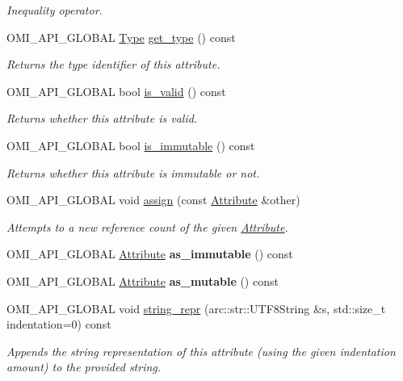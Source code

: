 \begin{DoxyCompactItemize}
\begin{DoxyCompactList}\small\item\em Inequality operator. \end{DoxyCompactList}\item 
O\+M\+I\+\_\+\+A\+P\+I\+\_\+\+G\+L\+O\+B\+AL \hyperlink{classomi_1_1_attribute_aae4992bc8d2b12679548909bc813eecf}{Type} \hyperlink{classomi_1_1_attribute_a30e2d8416ee8f9f0f972ddbd2f6c135c}{get\+\_\+type} () const 
\begin{DoxyCompactList}\small\item\em Returns the type identifier of this attribute. \end{DoxyCompactList}\item 
O\+M\+I\+\_\+\+A\+P\+I\+\_\+\+G\+L\+O\+B\+AL bool \hyperlink{classomi_1_1_attribute_aa4b45d4043cffdd1c729c1d89a484324}{is\+\_\+valid} () const 
\begin{DoxyCompactList}\small\item\em Returns whether this attribute is valid. \end{DoxyCompactList}\item 
O\+M\+I\+\_\+\+A\+P\+I\+\_\+\+G\+L\+O\+B\+AL bool \hyperlink{classomi_1_1_attribute_a33a211557a8c81e83ba3ada08f7198f1}{is\+\_\+immutable} () const 
\begin{DoxyCompactList}\small\item\em Returns whether this attribute is immutable or not. \end{DoxyCompactList}\item 
O\+M\+I\+\_\+\+A\+P\+I\+\_\+\+G\+L\+O\+B\+AL void \hyperlink{classomi_1_1_attribute_aa349cb49ea5438fb35d7929e755ea04f}{assign} (const \hyperlink{classomi_1_1_attribute}{Attribute} \&other)
\begin{DoxyCompactList}\small\item\em Attempts to a new reference count of the given \hyperlink{classomi_1_1_attribute}{Attribute}. \end{DoxyCompactList}\item 
O\+M\+I\+\_\+\+A\+P\+I\+\_\+\+G\+L\+O\+B\+AL \hyperlink{classomi_1_1_attribute}{Attribute} {\bfseries as\+\_\+immutable} () const \hypertarget{classomi_1_1_attribute_a37e99eea4065c73b3b0090397aef4bcc}{}\label{classomi_1_1_attribute_a37e99eea4065c73b3b0090397aef4bcc}

\item 
O\+M\+I\+\_\+\+A\+P\+I\+\_\+\+G\+L\+O\+B\+AL \hyperlink{classomi_1_1_attribute}{Attribute} {\bfseries as\+\_\+mutable} () const \hypertarget{classomi_1_1_attribute_a55eaada612dc1c74f80e4373dbc3635c}{}\label{classomi_1_1_attribute_a55eaada612dc1c74f80e4373dbc3635c}

\item 
O\+M\+I\+\_\+\+A\+P\+I\+\_\+\+G\+L\+O\+B\+AL void \hyperlink{classomi_1_1_attribute_a643b44b90d0c4e057624f5d8949c625a}{string\+\_\+repr} (arc\+::str\+::\+U\+T\+F8\+String \&s, std\+::size\+\_\+t indentation=0) const 
\begin{DoxyCompactList}\small\item\em Appends the string representation of this attribute (using the given indentation amount) to the provided string. \end{DoxyCompactList}\end{DoxyCompactItemize}
